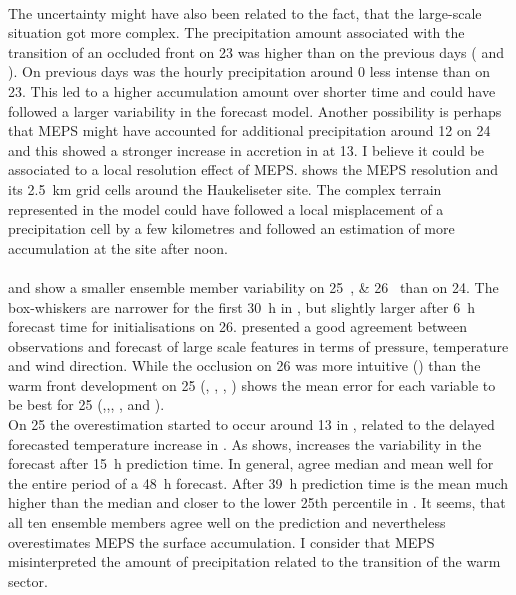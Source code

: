 \\
The uncertainty might have also been related to the fact, that the large-scale situation got more complex. The precipitation amount associated with the transition of an occluded front on \SI{23}{\dec} was higher than on the previous days ( and ). On previous days was the hourly precipitation around \SI{0}{\UTC} less intense than on \SI{23}{\dec}. This led to a higher accumulation amount over shorter time and could have followed a larger variability in the forecast model. Another possibility is perhaps that MEPS might have accounted for additional precipitation around \SI{12}{\UTC} on \SI{24}{\dec} and this showed a stronger increase in accretion in  at \SI{13}{\UTC}. I believe it could be associated to a local resolution effect of MEPS.  shows the MEPS resolution and its \SI{2.5}{\km} grid cells around the Haukeliseter site. The complex terrain represented in the model could have followed a local misplacement of a precipitation cell by a few kilometres and followed an estimation of more accumulation at the site after noon.
\\
\\
 and  show a smaller ensemble member variability on \SIlist{25;26}{\dec} than on \SI{24}{\dec}. The box-whiskers are narrower for the first \SI{30}{\hour} in , but slightly larger after \SI{6}{\hour} forecast time for initialisations on \SI{26}{\dec}.  presented a good agreement between observations and forecast of large scale features in terms of pressure, temperature and wind direction. While the occlusion on \SI{26}{\dec} was more intuitive () than the warm front development on \SI{25}{\dec} (, , , ) shows the mean error for each variable to be best for \SI{25}{\dec} (,,, , and ).
\\
On \SI{25}{\dec} the overestimation started to occur around \SI{13}{\UTC} in , related to the delayed forecasted temperature increase in .  As  shows, increases the variability in the forecast after \SI{15}{\hour} prediction time. In general, agree median and mean well for the entire period of a \SI{48}{\hour} forecast. After \SI{39}{\hour} prediction time is the mean much higher than the median and closer to the lower 25th percentile in . It seems, that all ten ensemble members agree well on the prediction and nevertheless overestimates MEPS the surface accumulation. I consider that MEPS misinterpreted the amount of precipitation related to the transition of the warm sector.  
